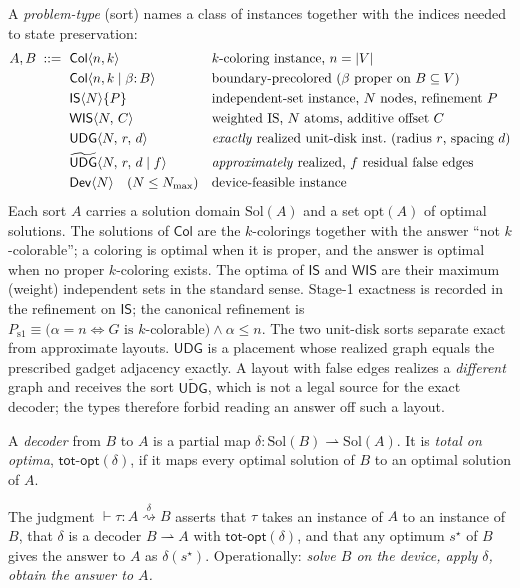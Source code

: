 \documentclass[a4paper,fleqn]{cas-sc}
\newcommand{\indep}{\alpha}
\newcommand{\tCol}{\mathsf{Col}}
\newcommand{\tIS}{\mathsf{IS}}
\newcommand{\tWIS}{\mathsf{WIS}}
\newcommand{\tUDG}{\mathsf{UDG}}
\newcommand{\tUDGa}{\widetilde{\mathsf{UDG}}}
\newcommand{\tDev}{\mathsf{Dev}}
\newcommand{\Sol}{\mathrm{Sol}}
\newcommand{\Nmax}{N_{\max}}
\newcommand{\totopt}{\mathsf{tot\text{-}opt}}
\newcommand{\redto}[1]{\mathrel{\overset{\textstyle #1}{\rightsquigarrow}}}
\begin{document}
A \emph{problem-type} (sort) names a class of instances together with the indices
needed to state preservation:
\begin{align*}
A,B \;::=\;
&\ \tCol\langle n,k\rangle                       && \text{$k$-coloring instance, $n=|V|$}\\
&\ \tCol\langle n,k \mid \beta{:}\,B\rangle       && \text{boundary-precolored ($\beta$ proper on $B\subseteq V$)}\\
&\ \tIS\langle N\rangle\{P\}                      && \text{independent-set instance, $N$ nodes, refinement $P$}\\
&\ \tWIS\langle N,\,C\rangle                       && \text{weighted IS, $N$ atoms, additive offset $C$}\\
&\ \tUDG\langle N,\,r,\,d\rangle                   && \text{\emph{exactly} realized unit-disk inst.\ (radius $r$, spacing $d$)}\\
&\ \tUDGa\langle N,\,r,\,d \mid f\rangle           && \text{\emph{approximately} realized, $f$ residual false edges}\\
&\ \tDev\langle N\rangle \quad (N\le \Nmax)        && \text{device-feasible instance}
\end{align*}
Each sort $A$ carries a solution domain $\Sol(A)$ and a set $\mathrm{opt}(A)$ of
optimal solutions. The solutions of $\tCol$ are the $k$-colorings together with the
answer ``not $k$-colorable''; a coloring is optimal when it is proper, and the answer
is optimal when no proper $k$-coloring exists. The optima of $\tIS$ and $\tWIS$ are
their maximum (weight) independent sets in the standard sense.
Stage-1 exactness is recorded in the refinement on $\tIS$; the canonical refinement is
$P_{\mathrm{s1}} \equiv \bigl(\indep = n \iff G \text{ is } k\text{-colorable}\bigr)\wedge \indep\le n$.
The two unit-disk sorts separate exact from approximate layouts. $\tUDG$ is a placement
whose realized graph equals the prescribed gadget adjacency exactly. A layout with
false edges realizes a \emph{different} graph and receives the sort $\tUDGa$, which is
not a legal source for the exact decoder; the types therefore forbid reading an
answer off such a layout.
\begin{definition}
A \emph{decoder} from $B$ to $A$ is a partial map
$\delta:\Sol(B)\rightharpoonup\Sol(A)$. It is \emph{total on optima},
$\totopt(\delta)$, if it maps every optimal solution of $B$ to an optimal solution
of $A$.
\end{definition}

\begin{definition}
The judgment $\vdash \tau : A \redto{\delta} B$ asserts that $\tau$ takes an
instance of $A$ to an instance of $B$, that $\delta$ is a decoder
$B\!\rightharpoonup\!A$ with $\totopt(\delta)$, and that any optimum $s^\star$ of
$B$ gives the answer to $A$ as $\delta(s^\star)$. Operationally: \emph{solve $B$
on the device, apply $\delta$, obtain the answer to $A$.}
\end{definition}
\end{document}
